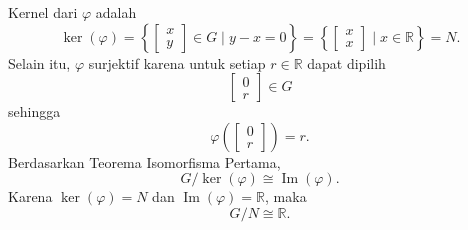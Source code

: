 \documentclass[10pt,a4paper]{article}
\begin{document}
\begin{enumerate}
        Kernel dari $\varphi$ adalah
        \[
          \ker(\varphi)
          =
          \left\{
          \begin{bmatrix}
            x\\y
          \end{bmatrix}
          \in G \mid y-x=0
          \right\}
          =
          \left\{
          \begin{bmatrix}
            x\\x
          \end{bmatrix}
          \mid x\in\mathbb{R}
          \right\}
          =N.
        \]
        Selain itu, $\varphi$ surjektif karena untuk setiap $r\in\mathbb{R}$ dapat dipilih
        \[
          \begin{bmatrix}
            0\\r
          \end{bmatrix}
          \in G
        \]
        sehingga
        \[
          \varphi\left(
          \begin{bmatrix}
            0\\r
          \end{bmatrix}
          \right)=r.
        \]
        Berdasarkan Teorema Isomorfisma Pertama,
        \[
          G/\ker(\varphi)\cong \operatorname{Im}(\varphi).
        \]
        Karena $\ker(\varphi)=N$ dan $\operatorname{Im}(\varphi)=\mathbb{R}$, maka
        \[
          \boxed{G/N\cong\mathbb{R}.}
        \]
\end{enumerate}
\end{document}
